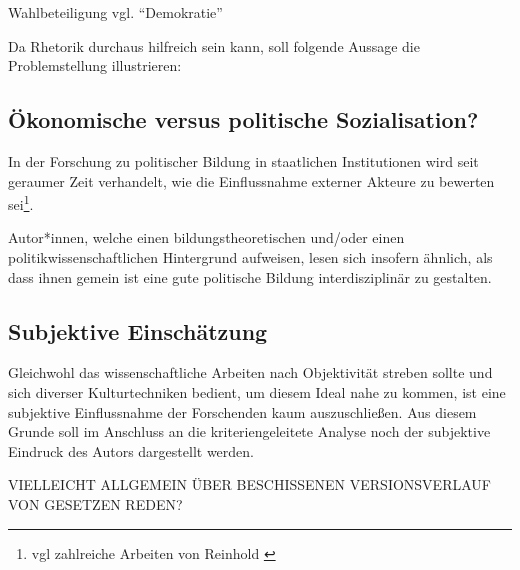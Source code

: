 
Wahlbeteiligung vgl. \enquote{Demokratie}

Da Rhetorik durchaus hilfreich sein kann, soll folgende Aussage die Problemstellung illustrieren:











\subsection{Ökonomische versus politische Sozialisation?}
In der Forschung zu politischer Bildung in staatlichen Institutionen wird seit geraumer Zeit verhandelt, wie die Einflussnahme externer Akteure zu bewerten sei\footnote{\gls{vgl} zahlreiche Arbeiten von Reinhold \textcite[\gls{zb}][]{Hedtke2016}}. 

Autor*innen, welche einen bildungstheoretischen und/oder einen politikwissenschaftlichen Hintergrund aufweisen, lesen sich insofern ähnlich, als dass ihnen gemein ist eine gute politische Bildung interdisziplinär zu gestalten.










\subsection{Subjektive Einschätzung}
Gleichwohl das wissenschaftliche Arbeiten nach Objektivität streben sollte und sich diverser Kulturtechniken bedient, um diesem Ideal nahe zu kommen, ist eine subjektive Einflussnahme der Forschenden kaum auszuschließen. Aus diesem Grunde soll im Anschluss an %
die kriteriengeleitete Analyse noch der subjektive Eindruck des Autors dargestellt werden. 





VIELLEICHT ALLGEMEIN ÜBER BESCHISSENEN VERSIONSVERLAUF VON GESETZEN REDEN?

